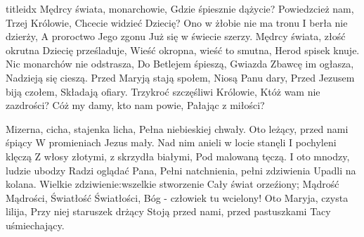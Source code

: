 \documentclass[a5paper, portrait, 12pt]{mwart}
\begin{document}
\begin{songs}{titleidx}
\beginverse
    Mędrcy świata, monarchowie,
    Gdzie śpiesznie dążycie?
    Powiedzcież nam, Trzej Królowie,
    Chcecie widzieć Dziecię?
\endverse
\beginchorus
    Ono w żłobie nie ma tronu
    I berła nie dzierży,
    A proroctwo Jego zgonu
    Już się w świecie szerzy.
\endchorus
\beginverse
    Mędrcy świata, złość okrutna
    Dziecię prześladuje,
    Wieść okropna, wieść to smutna,
    Herod spisek knuje.
\endverse
\beginchorus
    Nic monarchów nie odstrasza,
    Do Betlejem śpieszą,
    Gwiazda Zbawcę im ogłasza,
    Nadzieją się cieszą.
\endchorus
\beginverse
    Przed Maryją stają społem,
    Niosą Panu dary,
    Przed Jezusem biją czołem,
    Składają ofiary.
\endverse
\beginchorus
    Trzykroć szczęśliwi Królowie,
    Któż wam nie zazdrości?
    Cóż my damy, kto nam powie,
    Pałając z miłości?
\endchorus
\endsong


\beginverse
Mizerna, cicha, stajenka licha, 
Pełna niebieskiej chwały. 
Oto leżący, przed nami śpiący 
W promieniach Jezus mały. 
\endverse
\beginverse
Nad nim anieli w locie stanęli 
I pochyleni klęczą 
Z włosy złotymi, z skrzydła białymi, 
Pod malowaną tęczą. 
\endverse
\beginverse
I oto mnodzy, ludzie ubodzy 
Radzi oglądać Pana, 
Pełni natchnienia, pełni zdziwienia 
Upadli na kolana.
\endverse
\beginverse
Wielkie zdziwienie:wszelkie stworzenie
Cały świat orzeźiony;
Mądrość Mądrości, Światłość Światłości,
Bóg - człowiek tu wcielony!
\endverse
\beginverse
Oto Maryja, czysta lilija, 
Przy niej staruszek drżący 
Stoją przed nami, przed pastuszkami 
Tacy uśmiechający.
\endverse
\endsong



\end{songs}
\end{document}
